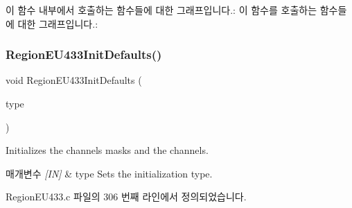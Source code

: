이 함수 내부에서 호출하는 함수들에 대한 그래프입니다.\+:
이 함수를 호출하는 함수들에 대한 그래프입니다.\+:
\mbox{\label{group___r_e_g_i_o_n_e_u433_ga1961913d7b9857e1804f455b59428186}} 
\subsubsection{\texorpdfstring{Region\+E\+U433\+Init\+Defaults()}{RegionEU433InitDefaults()}}
{\footnotesize\ttfamily void Region\+E\+U433\+Init\+Defaults (\begin{DoxyParamCaption}\item[{\mbox{\hyperlink{group___r_e_g_i_o_n_gaddc73ae10673ec925724e7870363bda9}{Init\+Type\+\_\+t}}}]{type }\end{DoxyParamCaption})}



Initializes the channels masks and the channels. 


\begin{DoxyParams}{매개변수}
{\em \mbox{[}\+I\+N\mbox{]}} & type Sets the initialization type. \\
\hline
\end{DoxyParams}


Region\+E\+U433.\+c 파일의 306 번째 라인에서 정의되었습니다.


